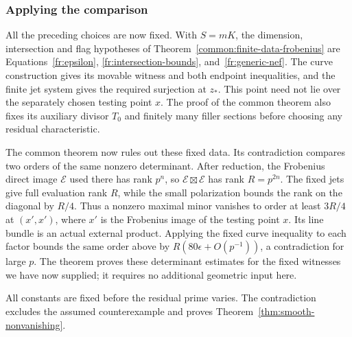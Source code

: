 \subsubsection{Applying the comparison}

All the preceding choices are now fixed. With $S=mK$, the dimension,
intersection and flag hypotheses of
Theorem~\ref{common:finite-data-frobenius} are
Equations~\eqref{fr:epsilon}, \eqref{fr:intersection-bounds},
and~\eqref{fr:generic-nef}. The curve construction gives its movable
witness and both endpoint inequalities, and the finite jet system
gives the required surjection at $z_*$. This point need not lie over
the separately chosen testing point $x$. The proof of the common
theorem also fixes its auxiliary divisor $T_0$ and finitely many
filler sections before choosing any residual characteristic.

The common theorem now rules out these fixed data. Its contradiction
compares two orders of the same nonzero determinant. After reduction,
the Frobenius direct image \(\mathcal E\) used there has rank \(p^n\),
so \(\mathcal E\boxtimes\mathcal E\) has rank \(R=p^{2n}\). The fixed
jets give full evaluation rank \(R\), while the small polarization
bounds the rank on the diagonal by \(R/4\). Thus a nonzero maximal
minor vanishes to order at least \(3R/4\) at \((x',x')\), where \(x'\)
is the Frobenius image of the testing point \(x\). Its line bundle
is an actual external product. Applying the fixed curve inequality
to each factor bounds the same order above by
\(R(80\epsilon+O(p^{-1}))\), a contradiction for large \(p\).
The theorem proves these determinant estimates for the fixed witnesses
we have now supplied; it requires no additional geometric input here.

All constants are fixed before the residual prime varies.
The contradiction excludes the assumed counterexample and proves
Theorem~\ref{thm:smooth-nonvanishing}.
